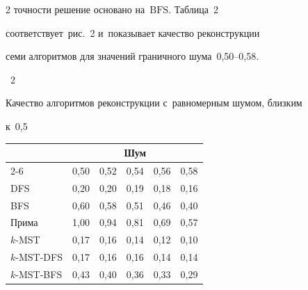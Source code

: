 \begin{multicols}{2}
точности решение основано на~$\text{BFS}$. Таб\-ли\-ца~2 

соответствует~рис.~2 и~показывает качество реконструкции 

семи алгоритмов для значений граничного шума~0,50--0,58.












\begin{center}

\parbox{75mm}{{{\tablename~2}\ \ \small{Качество алгоритмов реконструкции с~равномерным шумом, близким 

к~0,5

}}

}

    

    

\vspace*{6pt}



  {\small  \begin{tabular}{|l|ccccc|}

      \hline

                  & \multicolumn{5}{c|}{Шум}\\%

       \cline{2-6}

        \multicolumn{1}{|c|}{\raisebox{6pt}[0pt][0pt]{Алгоритм}}                          

&0,50&0,52&0,54&0,56&0,58\\

                    \hline

      DFS        &0,20 &0,20 &0,19 &0,18 &0,16\\

      BFS        &0,60 &0,58 &0,51 &0,46 &0,40\\

      Прима    &1,00 &0,94&0,81&0,69&0,57\\

      $k$-MST     &0,17 &0,16 &0,14 &0,12 &0,10\\

      $k$-MST-DFS   &0,17 &0,16 &0,16 &0,14 &0,14 \\

      $k$-MST-BFS   &0,43 &0,40 &0,36 &0,33 &0,29 \\


\end{tabular}}
\end{center}
\end{multicols}
